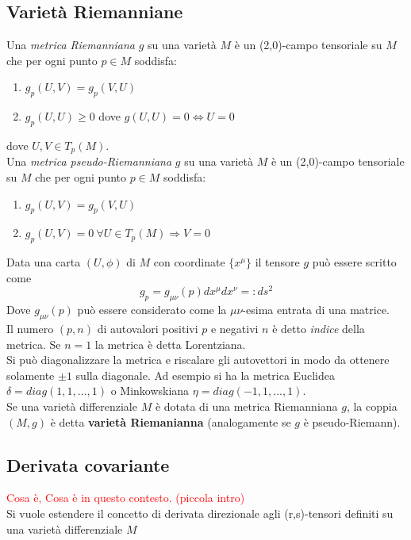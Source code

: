 \subsection{Varietà Riemanniane}
\begin{definition}
   Una \emph{metrica Riemanniana} $g$ su una varietà $M$ è un (2,0)-campo tensoriale
   su $M$ che per ogni punto $p \in M$ soddisfa:
   \begin{enumerate}
      \item $ g_p(U,V) = g_p(V,U) $
      \item $ g_p(U,U) \geq 0 $ dove $ g(U,U) = 0 \iff U = 0$
   \end{enumerate}
   dove $U,V \in T_p(M)$.\\

   Una \emph{metrica pseudo-Riemanniana} $g$ su una varietà $M$ è un
   (2,0)-campo tensoriale su $M$ che per ogni punto $p \in M$ soddisfa:
   \begin{enumerate}
      \item $ g_p(U,V) = g_p(V,U) $
      \item $ g_p(U,V) = 0 \: \forall U \in T_p(M) \Rightarrow V = 0$
   \end{enumerate}
\end{definition}

Data una carta $(U,\phi)$ di $M$ con coordinate $\{x^\mu\}$ il tensore $g$ può
essere scritto come
$$ g_p = g_{\mu\nu}(p) dx^\mu dx^\nu =: ds^2$$
Dove $g_{\mu\nu}(p)$ può essere considerato come la $\mu\nu$-esima entrata di una matrice.\\
Il numero $(p,n)$ di autovalori positivi $p$ e negativi $n$ è detto \emph{indice} della
metrica. Se $n=1$ la metrica è detta Lorentziana.\\
Si può diagonalizzare la metrica e riscalare gli autovettori in modo da ottenere
solamente $\pm 1$ sulla diagonale. Ad esempio si ha la metrica Euclidea
$\delta = diag(1,1,\dots,1)$ o Minkowskiana $\eta = diag(-1,1,...,1)$.\\

Se una varietà differenziale $M$ è dotata di una metrica Riemanniana $g$, la coppia $(M,g)$
è detta \textbf{varietà Riemanianna} (analogamente se $g$ è pseudo-Riemann).\\

\subsection{Derivata covariante}
\textcolor{red}{Cosa è, Cosa è in questo contesto. (piccola intro)}\\
Si vuole estendere il concetto di derivata direzionale agli (r,s)-tensori definiti
su una varietà differenziale $M$\\

